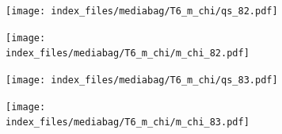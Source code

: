 \documentclass[
  11pt,
  letterpaper,
]{scrreprt}
\begin{document}
\begin{figure}

\begin{minipage}{0.50\linewidth}

\begin{figure}[H]

{\centering \texttt{[image: index\_files/mediabag/T6\_m\_chi/qs\_82.pdf]}

}


\end{figure}%

\end{minipage}%
%
\begin{minipage}{0.50\linewidth}

\begin{figure}[H]

{\centering \texttt{[image: index\_files/mediabag/T6\_m\_chi/m\_chi\_82.pdf]}

}


\end{figure}%

\end{minipage}%

\end{figure}%

\begin{figure}

\begin{minipage}{0.50\linewidth}

\begin{figure}[H]

{\centering \texttt{[image: index\_files/mediabag/T6\_m\_chi/qs\_83.pdf]}

}


\end{figure}%

\end{minipage}%
%
\begin{minipage}{0.50\linewidth}

\begin{figure}[H]

{\centering \texttt{[image: index\_files/mediabag/T6\_m\_chi/m\_chi\_83.pdf]}

}


\end{figure}%

\end{minipage}%

\end{figure}%
\end{document}
